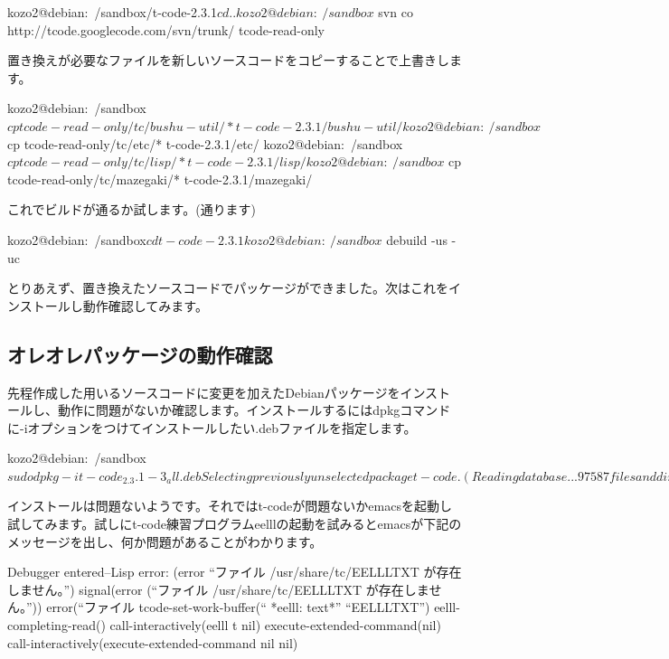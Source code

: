 \documentclass[mingoth,a4paper]{jsarticle}
\begin{document}
\begin{commandline}
kozo2@debian:~/sandbox/t-code-2.3.1$ cd ..
kozo2@debian:~/sandbox$ svn co http://tcode.googlecode.com/svn/trunk/ tcode-read-only
\end{commandline}

置き換えが必要なファイルを新しいソースコードをコピーすることで上書きします。

\begin{commandline}
kozo2@debian:~/sandbox$ cp tcode-read-only/tc/bushu-util/* t-code-2.3.1/bushu-util/
kozo2@debian:~/sandbox$ cp tcode-read-only/tc/etc/* t-code-2.3.1/etc/
kozo2@debian:~/sandbox$ cp tcode-read-only/tc/lisp/* t-code-2.3.1/lisp/
kozo2@debian:~/sandbox$ cp tcode-read-only/tc/mazegaki/* t-code-2.3.1/mazegaki/
\end{commandline}

これでビルドが通るか試します。(通ります)

\begin{commandline}
kozo2@debian:~/sandbox$ cd t-code-2.3.1
kozo2@debian:~/sandbox$ debuild -us -uc
\end{commandline}

とりあえず、置き換えたソースコードでパッケージができました。次はこれをインストールし動作確認してみます。

\subsection{オレオレパッケージの動作確認}
先程作成した用いるソースコードに変更を加えたDebianパッケージをインストールし、動作に問題がないか確認します。インストールするにはdpkgコマンドに-iオプションをつけてインストールしたい.debファイルを指定します。

\begin{commandline}
kozo2@debian:~/sandbox$ sudo dpkg -i t-code_2.3.1-3_all.deb 
Selecting previously unselected package t-code.
(Reading database ... 97587 files and directories currently installed.)
Unpacking t-code (from t-code_2.3.1-3_all.deb) ...
Setting up t-code (2:2.3.1-3) ...
install/t-code: Handling install for emacsen flavor emacs23
Processing triggers for install-info ...
kozo2@debian:~/sandbox$ 
\end{commandline}

インストールは問題ないようです。それではt-codeが問題ないかemacsを起動し試してみます。試しにt-code練習プログラムeelllの起動を試みるとemacsが下記のメッセージを出し、何か問題があることがわかります。

\begin{commandline}
Debugger entered--Lisp error: (error ``ファイル /usr/share/tc/EELLLTXT が存在しません。'')
  signal(error (``ファイル /usr/share/tc/EELLLTXT が存在しません。''))
  error(``ファイル %
  tcode-set-work-buffer(`` *eelll: text*'' ``EELLLTXT'')
  eelll-completing-read()
  call-interactively(eelll t nil)
  execute-extended-command(nil)
  call-interactively(execute-extended-command nil nil)
\end{commandline}
\end{document}
